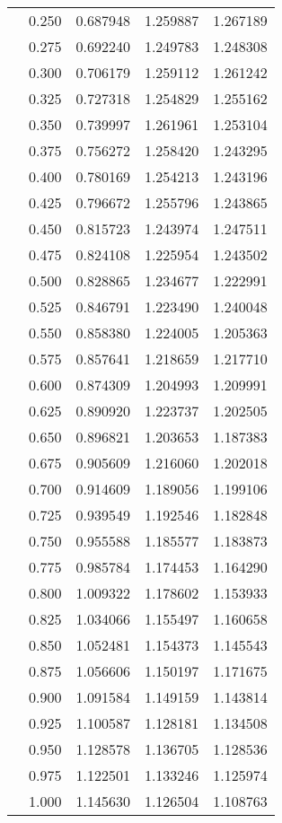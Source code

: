 \begin{tabular}{llrrr}
         & 0.250 &   0.687948 &   1.259887 &   1.267189 \\
         & 0.275 &   0.692240 &   1.249783 &   1.248308 \\
         & 0.300 &   0.706179 &   1.259112 &   1.261242 \\
         & 0.325 &   0.727318 &   1.254829 &   1.255162 \\
         & 0.350 &   0.739997 &   1.261961 &   1.253104 \\
         & 0.375 &   0.756272 &   1.258420 &   1.243295 \\
         & 0.400 &   0.780169 &   1.254213 &   1.243196 \\
         & 0.425 &   0.796672 &   1.255796 &   1.243865 \\
         & 0.450 &   0.815723 &   1.243974 &   1.247511 \\
         & 0.475 &   0.824108 &   1.225954 &   1.243502 \\
         & 0.500 &   0.828865 &   1.234677 &   1.222991 \\
         & 0.525 &   0.846791 &   1.223490 &   1.240048 \\
         & 0.550 &   0.858380 &   1.224005 &   1.205363 \\
         & 0.575 &   0.857641 &   1.218659 &   1.217710 \\
         & 0.600 &   0.874309 &   1.204993 &   1.209991 \\
         & 0.625 &   0.890920 &   1.223737 &   1.202505 \\
         & 0.650 &   0.896821 &   1.203653 &   1.187383 \\
         & 0.675 &   0.905609 &   1.216060 &   1.202018 \\
         & 0.700 &   0.914609 &   1.189056 &   1.199106 \\
         & 0.725 &   0.939549 &   1.192546 &   1.182848 \\
         & 0.750 &   0.955588 &   1.185577 &   1.183873 \\
         & 0.775 &   0.985784 &   1.174453 &   1.164290 \\
         & 0.800 &   1.009322 &   1.178602 &   1.153933 \\
         & 0.825 &   1.034066 &   1.155497 &   1.160658 \\
         & 0.850 &   1.052481 &   1.154373 &   1.145543 \\
         & 0.875 &   1.056606 &   1.150197 &   1.171675 \\
         & 0.900 &   1.091584 &   1.149159 &   1.143814 \\
         & 0.925 &   1.100587 &   1.128181 &   1.134508 \\
         & 0.950 &   1.128578 &   1.136705 &   1.128536 \\
         & 0.975 &   1.122501 &   1.133246 &   1.125974 \\
         & 1.000 &   1.145630 &   1.126504 &   1.108763 \\
\bottomrule
\end{tabular}

